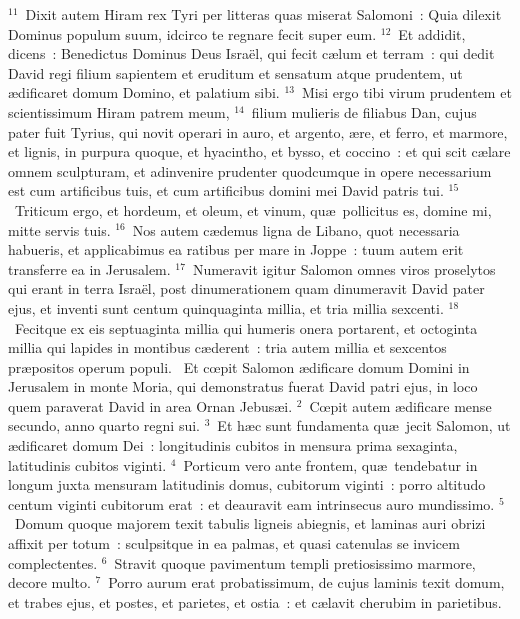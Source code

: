 ${}^{11}$~Dixit autem Hiram rex Tyri per litteras quas miserat Salomoni~: Quia dilexit Dominus populum suum, idcirco te regnare fecit super eum.
${}^{12}$~Et addidit, dicens~: Benedictus Dominus Deus Isra\"el, qui fecit c\ae lum et terram~: qui dedit David regi filium sapientem et eruditum et sensatum atque prudentem, ut \ae dificaret domum Domino, et palatium sibi.
${}^{13}$~Misi ergo tibi virum prudentem et scientissimum Hiram patrem meum,
${}^{14}$~filium mulieris de filiabus Dan, cujus pater fuit Tyrius, qui novit operari in auro, et argento, \ae re, et ferro, et marmore, et lignis, in purpura quoque, et hyacintho, et bysso, et coccino~: et qui scit c\ae lare omnem sculpturam, et adinvenire prudenter quodcumque in opere necessarium est cum artificibus tuis, et cum artificibus domini mei David patris tui.
${}^{15}$~Triticum ergo, et hordeum, et oleum, et vinum, qu\ae\ pollicitus es, domine mi, mitte servis tuis.
${}^{16}$~Nos autem c\ae demus ligna de Libano, quot necessaria habueris, et applicabimus ea ratibus per mare in Joppe~: tuum autem erit transferre ea in Jerusalem.
${}^{17}$~Numeravit igitur Salomon omnes viros proselytos qui erant in terra Isra\"el, post dinumerationem quam dinumeravit David pater ejus, et inventi sunt centum quinquaginta millia, et tria millia sexcenti.
${}^{18}$~Fecitque ex eis septuaginta millia qui humeris onera portarent, et octoginta millia qui lapides in montibus c\ae derent~: tria autem millia et sexcentos pr\ae positos operum populi.
~\lettrine[lines=10,image=true,loversize=0.05,lraise=-0.03]{E}{}t cœpit Salomon \ae dificare domum Domini in Jerusalem in monte Moria, qui demonstratus fuerat David patri ejus, in loco quem paraverat David in area Ornan Jebus\ae i.
${}^{2}$~Cœpit autem \ae dificare mense secundo, anno quarto regni sui.
${}^{3}$~Et h\ae c sunt fundamenta qu\ae\ jecit Salomon, ut \ae dificaret domum Dei~: longitudinis cubitos in mensura prima sexaginta, latitudinis cubitos viginti.
${}^{4}$~Porticum vero ante frontem, qu\ae\ tendebatur in longum juxta mensuram latitudinis domus, cubitorum viginti~: porro altitudo centum viginti cubitorum erat~: et deauravit eam intrinsecus auro mundissimo.
${}^{5}$~Domum quoque majorem texit tabulis ligneis abiegnis, et laminas auri obrizi affixit per totum~: sculpsitque in ea palmas, et quasi catenulas se invicem complectentes.
${}^{6}$~Stravit quoque pavimentum templi pretiosissimo marmore, decore multo.
${}^{7}$~Porro aurum erat probatissimum, de cujus laminis texit domum, et trabes ejus, et postes, et parietes, et ostia~: et c\ae lavit cherubim in parietibus.
